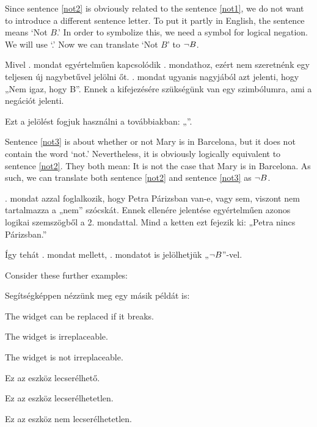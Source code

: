 Since sentence \ref{not2} is obviously related to the sentence \ref{not1}, we do not want to introduce a different sentence letter. To put it partly in English, the sentence means `Not $B$.' In order to symbolize this, we need a symbol for logical negation. We will use `\enot.' Now we can translate `Not $B$' to $\neg B$.

Mivel . mondat egyértelműen kapcsolódik . mondathoz, ezért nem szeretnénk egy teljesen új nagybetűvel jelölni őt.
. mondat ugyanis nagyjából azt jelenti, hogy „Nem igaz, hogy B”.
Ennek a kifejezésére szükségünk van egy szimbólumra, ami a negációt jelenti.

Ezt a jelölést fogjuk használni a továbbiakban: „\enot”.

Sentence \ref{not3} is about whether or not Mary is in Barcelona, but it does not contain the word `not.' Nevertheless, it is obviously logically equivalent to sentence \ref{not2}. They both mean: It is not the case that Mary is in Barcelona. As such, we can translate both sentence \ref{not2} and sentence \ref{not3} as $\neg B$.

. mondat azzal foglalkozik, hogy Petra Párizsban van-e, vagy sem, viszont nem tartalmazza a „nem” szócskát. Ennek ellenére jelentése egyértelműen azonos logikai szemszögből a 2. mondattal. Mind a ketten ezt fejezik ki: „Petra nincs Párizsban.”

Így tehát . mondat mellett, . mondatot is jelölhetjük „$\neg B$”-vel.



Consider these further examples:

Segítségképpen nézzünk meg egy másik példát is:

\begin{earg}
\item[\ex{not4}] The widget can be replaced if it breaks.
\item[\ex{not5}] The widget is irreplaceable.
\item[\ex{not5b}] The widget is not irreplaceable.
\end{earg}

\begin{earg}
\item[\ex{not4}] Ez az eszköz lecserélhető.
\item[\ex{not5}] Ez az eszköz lecserélhetetlen.
\item[\ex{not5b}] Ez az eszköz nem lecserélhetetlen.
\end{earg}


